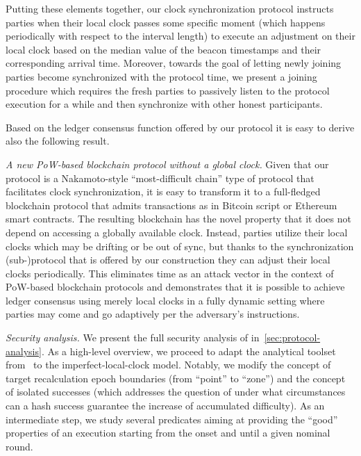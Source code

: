 Putting these elements together, our clock synchronization protocol instructs parties when their local clock passes some specific moment (which happens periodically with respect to the interval length) to execute an adjustment on their local clock based on the median value of the beacon timestamps and their corresponding arrival time.
%
Moreover, towards the goal of letting newly joining parties become synchronized with the protocol time, we present a joining procedure which requires the fresh parties to passively listen to the protocol execution for a while and then synchronize with other honest participants.

Based on the ledger consensus function offered by our protocol it is easy to derive also the following result.

\smallskip\noindent\emph{A new PoW-based blockchain protocol without a global clock.}
%
Given that our protocol is a Nakamoto-style ``most-difficult chain'' type of protocol that facilitates clock synchronization, it is easy to transform it to a full-fledged blockchain protocol that admits transactions as in Bitcoin script or Ethereum smart contracts.
%
The resulting blockchain has the novel property that it does not depend on accessing a globally available clock.
%
Instead, parties utilize their local clocks which may be drifting or be out of sync, but thanks to the synchronization (sub-)protocol that is offered by our construction they can adjust their local clocks periodically.
%
This eliminates time as an attack vector in the context of PoW-based blockchain protocols and demonstrates that it is possible to achieve ledger consensus using merely local clocks in a fully dynamic setting where parties may come and go adaptively per the adversary's instructions.

\smallskip\noindent\emph{Security analysis.}
%
We present the full security analysis of \timekeeper in~\cref{sec:protocol-analysis}.
%
As a high-level overview, we proceed to adapt the analytical toolset from~\cite{C:GarKiaLeo17,EPRINT:GarKiaLeo20} to the imperfect-local-clock model.
%
Notably, we modify the concept of target recalculation epoch boundaries (from ``point'' to ``zone'') and the concept of isolated successes (which addresses the question of under what circumstances can a hash success guarantee the increase of accumulated difficulty).
%
As an intermediate step, we study several predicates aiming at providing the ``good'' properties of an execution starting from the onset and until a given nominal round.

